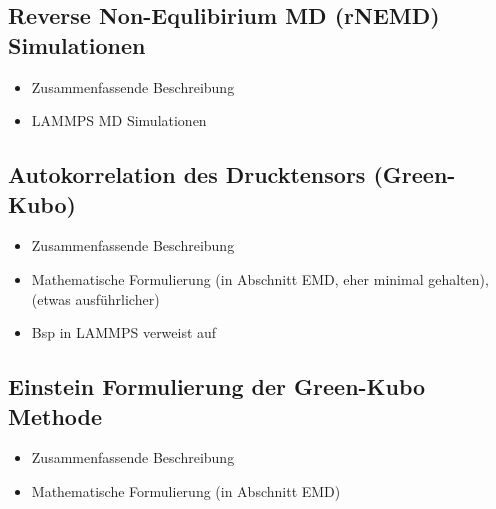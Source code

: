 \documentclass[a4paper, 10pt, 
               numbers=noenddot, toc=graduated,
               headsepline=true, footsepline=true,
               twoside=false, titlepage=true, 
               bibliography=totoc]{scrartcl}
\begin{document}
\subsection{Reverse Non-Equlibirium MD  (rNEMD) Simulationen}
	\begin{itemize}
		 \item Zusammenfassende Beschreibung \cite{Tenney2010} 
		 \item LAMMPS MD Simulationen \cite{Tenney2010} 
	\end{itemize}



\subsection{Autokorrelation des Drucktensors (Green-Kubo)}
	\begin{itemize}
		 \item Zusammenfassende Beschreibung \cite{Tenney2010}
		 \item Mathematische Formulierung  \cite{Tenney2010} (in Abschnitt EMD, eher minimal gehalten), \cite{Kirova2015} (etwas ausführlicher)
		 \item Bsp in LAMMPS verweist auf \cite{Daivis1994}
	\end{itemize}

\subsection{Einstein Formulierung der Green-Kubo Methode}
	\begin{itemize}
		 \item Zusammenfassende Beschreibung \cite{Tenney2010}
		 \item Mathematische Formulierung  \cite{Tenney2010} (in Abschnitt EMD)

	\end{itemize}






\end{document}
